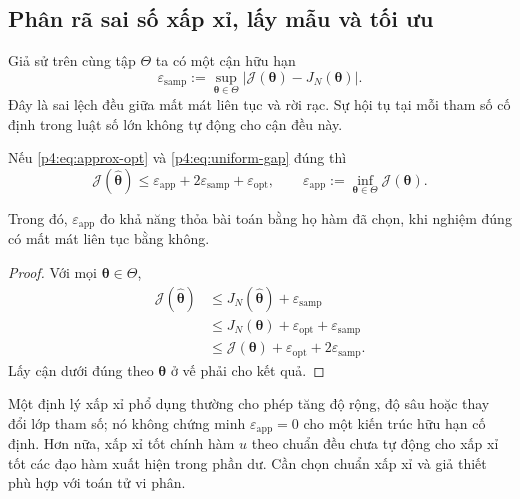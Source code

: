 \subsection{Phân rã sai số xấp xỉ, lấy mẫu và tối ưu}

Giả sử trên cùng tập $\Theta$ ta có một cận hữu hạn
\begin{equation}
 \varepsilon_{\mathrm{samp}}
 :=\sup_{\boldsymbol{\theta}\in\Theta}
       |\mathcal{J}(\boldsymbol{\theta})-J_N(\boldsymbol{\theta})|.
 \label{p4:eq:uniform-gap}
\end{equation}
Đây là sai lệch đều giữa mất mát liên tục và rời rạc. Sự hội tụ tại
mỗi tham số cố định trong luật số lớn không tự động cho cận đều này.

\begin{proposition}
Nếu \eqref{p4:eq:approx-opt} và \eqref{p4:eq:uniform-gap} đúng thì
\begin{equation}
 \mathcal{J}(\widehat{\boldsymbol{\theta}})
 \leq\varepsilon_{\mathrm{app}}+
          2\varepsilon_{\mathrm{samp}}+\varepsilon_{\mathrm{opt}},
 \qquad
 \varepsilon_{\mathrm{app}}:=\inf_{\boldsymbol{\theta}\in\Theta}
                                      \mathcal{J}(\boldsymbol{\theta}).
 \label{p4:eq:decomposition}
\end{equation}
\end{proposition}
Trong đó, $\varepsilon_{\mathrm{app}}$ đo khả năng thỏa bài toán bằng
họ hàm đã chọn, khi nghiệm đúng có mất mát liên tục bằng không.

\begin{proof}
Với mọi $\boldsymbol{\theta}\in\Theta$,
\begin{align*}
 \mathcal{J}(\widehat{\boldsymbol{\theta}})
 &\leq J_N(\widehat{\boldsymbol{\theta}})+\varepsilon_{\mathrm{samp}}\\
 &\leq J_N(\boldsymbol{\theta})+
                         \varepsilon_{\mathrm{opt}}+\varepsilon_{\mathrm{samp}}\\
 &\leq\mathcal{J}(\boldsymbol{\theta})+
                         \varepsilon_{\mathrm{opt}}+2\varepsilon_{\mathrm{samp}}.
\end{align*}
Lấy cận dưới đúng theo $\boldsymbol{\theta}$ ở vế phải cho kết quả.
\end{proof}

Một định lý xấp xỉ phổ dụng thường cho phép tăng độ rộng, độ sâu hoặc
thay đổi lớp tham số; nó không chứng minh
$\varepsilon_{\mathrm{app}}=0$ cho một kiến trúc hữu hạn cố định.
Hơn nữa, xấp xỉ tốt chính hàm $u$ theo chuẩn đều chưa tự động cho xấp
xỉ tốt các đạo hàm xuất hiện trong phần dư. Cần chọn chuẩn xấp xỉ và
giả thiết phù hợp với toán tử vi phân.

